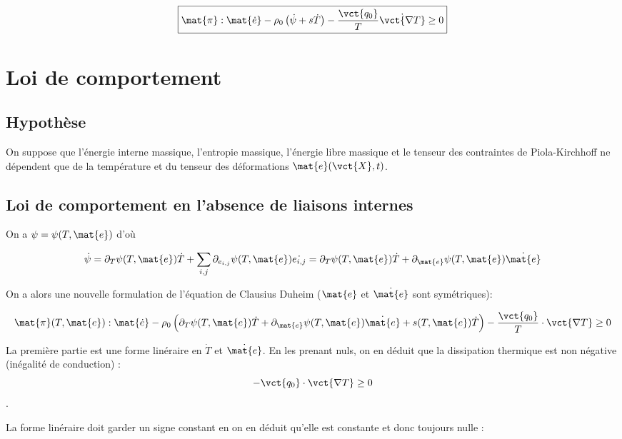 \documentclass[11pt,a4paper]{article}
\begin{document}
\begin{equation}
\label{eq:clausiusduheimLag}
\boxed{\mat{\pi}:\mat{\dot{e}}-\rho_0\left(\dot{\psi}+s\dot{T}\right)-\frac{\vct{q_0}}{T}\dot{\vct{\nabla T}}\geq 0}
\end{equation}

\section{Loi de comportement}

\subsection{Hypothèse}
On suppose que l'énergie interne massique, l'entropie massique, l'énergie libre massique et le tenseur des contraintes de Piola-Kirchhoff ne dépendent que de la température et du tenseur des déformations $\mat{e}(\vct{X},t)$.

\subsection{Loi de comportement en l'absence de liaisons internes}

On a $\psi=\psi(T,\mat{e})$ d'où 

\begin{equation}
\dot{\psi}=\partial_T\psi(T,\mat{e})\dot{T}+\sum_{i,j}\partial_{e_{i,j}}\psi(T,\mat{e})\dot{e_{i,j}}=\partial_T\psi(T,\mat{e})\dot{T}+\partial_{\mat{e}}\psi(T,\mat{e})\dot{\mat{e}}
\end{equation}

On a alors une nouvelle formulation de l'équation de Clausius Duheim ($\mat{e}$ et $\dot{\mat{e}}$ sont symétriques):

\begin{equation}
\mat{\pi}(T,\mat{e}):\mat{\dot{e}}-\rho_0\left(\partial_T\psi(T,\mat{e})\dot{T}+\partial_{\mat{e}}\psi(T,\mat{e})\dot{\mat{e}}+s(T,\mat{e})\dot{T}\right)-\frac{\vct{q_0}}{T}\cdot\vct{\nabla T}\geq 0
\end{equation}

La première partie est une forme linéraire en $\dot{T}$ et $\dot{\mat{e}}$. En les prenant nuls, on en déduit que la dissipation thermique est non négative (inégalité de conduction) : \[-\vct{q_0}\cdot\vct{\nabla T}\geq 0\].

La forme linéraire doit garder un signe constant  en on en déduit qu'elle est constante et donc toujours nulle  :
\end{document}
